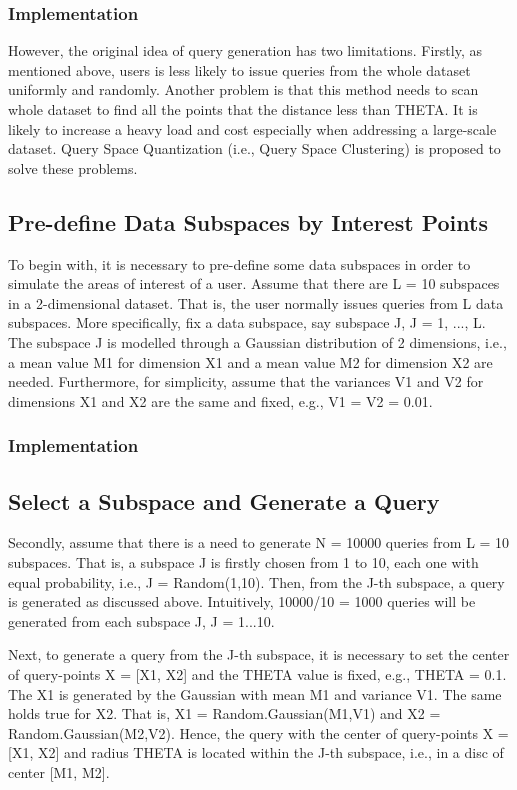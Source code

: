 \documentclass{lmproj}
\begin{document}
\subsubsection{Implementation}


However, the original idea of query generation has two limitations. Firstly, as mentioned above, users is less likely to issue queries from the whole dataset uniformly and randomly. Another problem is that this method needs to scan whole dataset to find all the points that the distance less than THETA. It is likely to increase a heavy load and cost especially when addressing a large-scale dataset. Query Space Quantization (i.e., Query Space Clustering) is proposed to solve these problems. 

\subsection{Pre-define Data Subspaces by Interest Points}
To begin with, it is necessary to pre-define some data subspaces in order to simulate the areas of interest of a user. Assume that there are L = 10 subspaces in a 2-dimensional dataset. That is, the user normally issues queries from L data subspaces. More specifically, fix a data subspace, say subspace J, J = 1, ..., L. The subspace J is modelled through a Gaussian distribution of 2 dimensions, i.e., a mean value M1 for dimension X1 and a mean value M2 for dimension X2 are needed. Furthermore, for simplicity, assume that the variances V1 and V2 for dimensions X1 and X2 are the same and fixed, e.g., V1 = V2 = 0.01. 

\subsubsection{Implementation}

\subsection{Select a Subspace and Generate a Query}
Secondly, assume that there is a need to generate N = 10000 queries from L = 10 subspaces. That is, a subspace J is firstly chosen from 1 to 10, each one with equal probability, i.e., J = Random(1,10). Then, from the J-th subspace, a query is generated as discussed above. Intuitively, 10000/10 = 1000 queries will be generated from each subspace J, J = 1...10. 

Next, to generate a query from the J-th subspace, it is necessary to set the center of query-points X = [X1, X2] and the THETA value is fixed, e.g., THETA = 0.1. The X1 is generated by the Gaussian with mean M1 and variance V1. The same holds true for X2. That is, X1 = Random.Gaussian(M1,V1) and X2 = Random.Gaussian(M2,V2). Hence, the query with the center of query-points X = [X1, X2] and radius THETA is located within the J-th subspace, i.e., in a disc of center [M1, M2].
\end{document}
